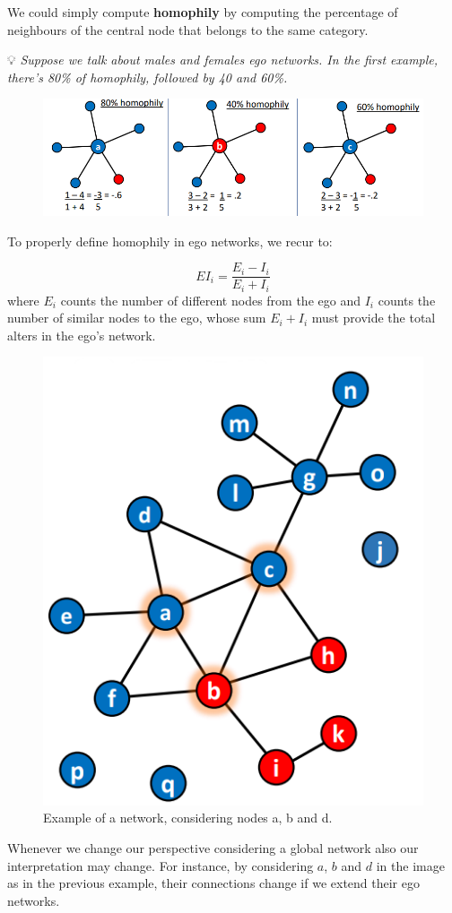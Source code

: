 \documentclass[
  notitlepage,
  onecolumn,
  openany]{book}
\begin{document}
We could simply compute \textbf{homophily} by computing the percentage of neighbours of the central node that belongs to the same category.

💡 \emph{Suppose we talk about males and females ego networks. In the first example, there's 80\% of homophily, followed by 40 and 60\%.}

\begin{figure}[h!]

{\centering \includegraphics[width=0.5\linewidth]{images/06-Attributes based measures/Untitled 2} 

}

\end{figure}

To properly define homophily in ego networks, we recur to:

\[
EI_i = \frac{E_i-I_i}{E_i+I_i}
\]
where \(E_i\) counts the number of different nodes from the ego and \(I_i\) counts the number of similar nodes to the ego, whose sum \(E_i+I_i\) must provide the total alters in the ego's network.

\begin{figure}[h!]

{\centering \includegraphics[width=0.3\linewidth]{images/06-Attributes based measures/Untitled 3} 

}

\caption{Example of a network, considering nodes a, b and d.}\label{fig:unnamed-chunk-34}
\end{figure}

Whenever we change our perspective considering a global network also our interpretation may change. For instance, by considering \(a\), \(b\) and \(d\) in the image as in the previous example, their connections change if we extend their ego networks.
\end{document}
